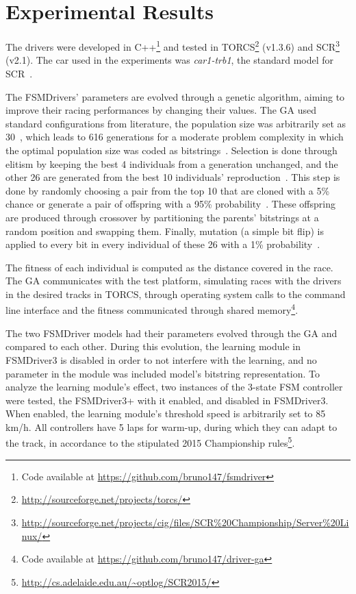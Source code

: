 \section{Experimental Results}\label{sec:4}%
\newcommand{\car}[1]{\emph{#1}}%

The drivers were developed in C++\footnote{Code available at \url{https://github.com/bruno147/fsmdriver}} and tested in TORCS\footnote{\url{http://sourceforge.net/projects/torcs/}} (v1.3.6) and SCR\footnote{\url{http://sourceforge.net/projects/cig/files/SCR\%20Championship/Server\%20Linux/}} (v2.1). The car used in the experiments was \car{car1-trb1}, the standard model for SCR~\cite{SCR}.

The FSMDrivers' parameters are evolved through a genetic algorithm, aiming to improve their racing performances by changing their values. The GA used standard configurations from literature, the population size was arbitrarily set as 30~\cite{RATES}, which leads to 616 generations for a moderate problem complexity in which the optimal population size was coded as bitstrings~\cite{218485}. Selection is done through elitism by keeping the best 4 individuals from a generation unchanged, and the other 26 are generated from the best 10 individuals' reproduction~\cite{ELITISM}. This step is done by randomly choosing a pair from the top 10 that are cloned with a 5\% chance or generate a pair of offspring with a 95\% probability~\cite{RATES}. These offspring are produced through crossover by partitioning the parents' bitstrings at a random position and swapping them. Finally, mutation (a simple bit flip) is applied to every bit in every individual of these 26 with a 1\% probability~\cite{RATES}.

The fitness of each individual is computed as the distance covered in the race. The GA communicates with the test platform, simulating races with the drivers in the desired tracks in TORCS, through operating system calls to the command line interface and the fitness communicated through shared memory\footnote{Code available at \url{https://github.com/bruno147/driver-ga}}.

The two FSMDriver models had their parameters evolved through the GA and compared to each other. During this evolution, the learning module in FSMDriver3 is disabled in order to not interfere with the learning, and no parameter in the module was included model's bitstring representation. To analyze the learning module's effect, two instances of the 3-state FSM controller were tested, the FSMDriver3+ with it enabled, and disabled in FSMDriver3. When enabled, the learning module's threshold speed is arbitrarily set to 85 km/h. All controllers have 5 laps for warm-up, during which they can adapt to the track, in accordance to the stipulated 2015 Championship rules\footnote{\url{http://cs.adelaide.edu.au/~optlog/SCR2015/}}.

